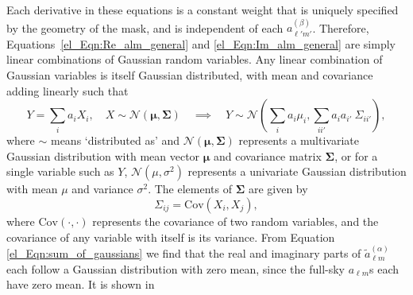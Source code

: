 Each derivative in these equations is a constant weight that is uniquely specified by the geometry of the mask, and is independent of each $a_{\ell' m'}^{\left( \beta \right)}$. Therefore, Equations~\eqref{el_Eqn:Re_alm_general} and \eqref{el_Eqn:Im_alm_general} are simply linear combinations of Gaussian random variables.
Any linear combination of Gaussian variables is itself Gaussian distributed, with mean and covariance adding linearly such that
\begin{equation}
Y = \sum_i a_i X_i, \quad X \sim \mathcal{N} \left( \bm{\mu},
\bm{\Sigma} \right)
\quad \implies \quad
Y \sim \mathcal{N} \left( \sum_i a_i \mu_i,
\sum_{i i'} a_i a_{i'} ~ \Sigma_{ii'} \right),
\label{el_Eqn:sum_of_gaussians}
\end{equation}
where $\sim$ means `distributed as' and $\mathcal{N} \left( \bm{\mu}, \bm{\Sigma} \right)$ represents a multivariate Gaussian distribution with mean vector $\bm{\mu}$ and covariance matrix $\bm{\Sigma}$, or for a single variable such as $Y$, $\mathcal{N} \left( \mu, \sigma^2 \right)$ represents a univariate Gaussian distribution with mean $\mu$ and variance $\sigma^2$. The elements of $\bm{\Sigma}$ are given by
\begin{equation}
\Sigma_{i j} = \mathrm{Cov} \left( X_i, X_j \right),
\end{equation}
where $\mathrm{Cov} \left( \cdot, \cdot \right)$ represents the covariance of two random variables, and the covariance of any variable with itself is its variance.
From Equation \eqref{el_Eqn:sum_of_gaussians} we find that the real and imaginary parts of $\widetilde{a}_{\ell m}^{\left( \alpha \right)}$ each follow a Gaussian distribution with zero mean, since the full-sky $a_{\ell m}$s each have zero mean. It is shown in

